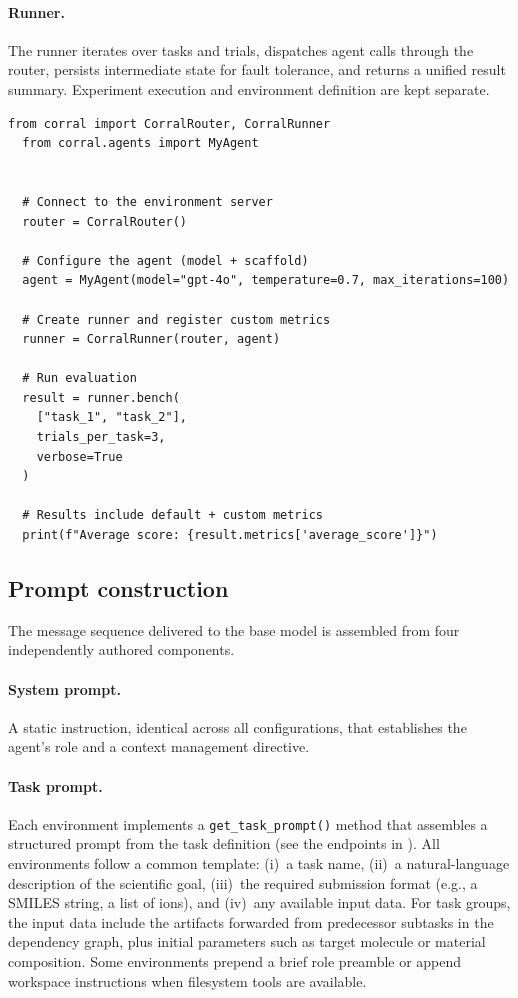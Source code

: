 \paragraph{Runner.} The \corral runner iterates over tasks and trials, dispatches agent calls through the router, persists intermediate state for fault tolerance, and returns a unified result summary. Experiment execution and environment definition are kept separate.


  \begin{lstlisting}[caption={Runner invocation with custom diagnostic metric.}]
  from corral import CorralRouter, CorralRunner
  from corral.agents import MyAgent


  # Connect to the environment server
  router = CorralRouter()

  # Configure the agent (model + scaffold)
  agent = MyAgent(model="gpt-4o", temperature=0.7, max_iterations=100)

  # Create runner and register custom metrics
  runner = CorralRunner(router, agent)

  # Run evaluation
  result = runner.bench(
    ["task_1", "task_2"],
    trials_per_task=3,
    verbose=True
  )

  # Results include default + custom metrics
  print(f"Average score: {result.metrics['average_score']}")
  \end{lstlisting}

\subsection{Prompt construction}
\label{app:prompt-construction}

The message sequence delivered to the base model is assembled from four independently authored components.

\paragraph{System prompt.} A static instruction, identical across all configurations, that establishes the agent's role and a context management directive.

\paragraph{Task prompt.} Each environment implements a \texttt{get\_task\_prompt()} method that assembles a structured prompt from the task definition (see the endpoints in ). All environments follow a common template: (i)~a task name, (ii)~a natural-language description of the scientific goal, (iii)~the required submission format (e.g., a SMILES string, a list of ions), and (iv)~any available input data. For task groups, the input data include the artifacts forwarded from predecessor subtasks in the dependency graph, plus initial parameters such as target molecule or material composition. Some environments prepend a brief role preamble or append workspace instructions when filesystem tools are available.

